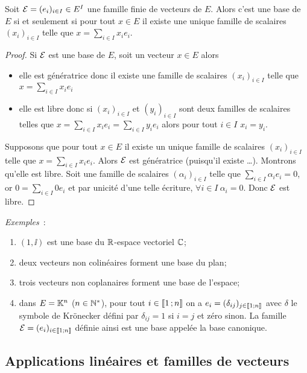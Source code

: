 \begin{theo}
  Soit \(\mathcal{E} = (e_i)_{i \in I} \in E^I\) une famille finie de vecteurs de \(E\). Alors c'est une base de \(E\) si et seulement si pour tout \(x \in E\) il existe une unique famille de scalaires \((x_i)_{i \in I}\) telle que \(x=\sum_{i \in I}x_i e_i\).
\end{theo}
\begin{proof}
  Si \(\mathcal{E}\) est une base de \(E\), soit un vecteur \(x \in E\) alors
  \begin{itemize}
  \item elle est génératrice donc il existe une famille de scalaires \((x_i)_{i \in I}\) telle que \(x=\sum_{i \in I} x_i e_i\)
  \item elle est libre donc si \((x_i)_{i \in I}\) et \((y_i)_{i \in I}\) sont deux familles de scalaires telles que \(x=\sum_{i \in I} x_i e_i=\sum_{i \in I} y_i e_i\) alors pour tout \(i \in I\) \(x_i =y_i\).
  \end{itemize}

  Supposons que pour tout \(x \in E\) il existe un unique famille de scalaires \((x_i)_{i \in I}\) telle que \(x=\sum_{i \in I}x_i e_i\). Alors \(\mathcal{E}\) est génératrice (puisqu'il existe \ldots). Montrons qu'elle est libre. Soit une famille de scalaires \((\alpha_i)_{i \in I}\) telle que \(\sum_{i \in I} \alpha_i e_i=0\), or \(0=\sum_{i \in I} 0 e_i\) et par unicité d'une telle écriture, \(\forall i \in I \ \alpha_i=0\). Donc \(\mathcal{E}\) est libre.
\end{proof}

\emph{Exemples}~:
\begin{enumerate}
\item \((1,\ii)\) est une base du \(\mathbb{R}\)-espace vectoriel \(\mathbb{C}\);
\item deux vecteurs non colinéaires forment une base du plan;
\item trois vecteurs non coplanaires forment une base de l'espace;
\item dans \(E=\mathbb{K}^n\) (\(n \in \mathbb{N}^*\)), pour tout \(i \in \mathopen{\llbracket}1\mathclose{}\mathpunct{};n\mathclose{\rrbracket}\) on a \(e_i = (\delta_{ij})_{j \in \mathopen{\llbracket}1\mathclose{}\mathpunct{};n\mathclose{\rrbracket}}\) avec \(\delta\) le symbole de Krönecker défini par \(\delta_{ij}=1\) si \(i=j\) et zéro sinon. La famille \(\mathcal{E}=(e_i)_{i \in \mathopen{\llbracket}1\mathclose{}\mathpunct{};n\mathclose{\rrbracket}}\) définie ainsi est une base appelée la base canonique.
\end{enumerate}

\subsection{Applications linéaires et familles de vecteurs}

